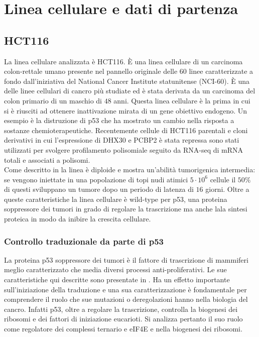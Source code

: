 \chapter{Linea cellulare e dati di partenza}
\label{cha:cell_lines}

\section{HCT116}
\label{sec:hct116}
La linea cellulare analizzata \`e HCT116.
\`E una linea cellulare di un carcinoma colon-rettale umano presente nel pannello originale delle $60$ linee caratterizzate a fondo dall'iniziativa del National Cancer Institute statunitense (NCI-$60$).
\`E una delle linee cellulari di cancro pi\`u studiate ed \`e stata derivata da un carcinoma del colon primario di un maschio di $48$ anni.
Questa linea cellulare \`e la prima in cui si \`e riusciti ad ottenere inattivazione mirata di un gene obiettivo endogeno.
Un esempio \`e la distruzione di p53 che ha mostrato un cambio nella risposta a sostanze chemioterapeutiche\cite{p53disruption}.
Recentemente cellule di HCT116 parentali e cloni derivativi in cui l'espressione di DHX30 e PCBP2 \`e stata repressa sono stati utilizzati per svolgere profilamento polisomiale seguito da RNA-seq di mRNA totali e associati a polisomi.\\
Come descritto in \cite{hct116} la linea \`e diploide e mostra un'abilit\`a tumorigenica intermedia: se vengono iniettate in una popolazione di topi nudi atimici $5\cdot 10^6$ cellule il $50\%$ di questi sviluppano un tumore dopo un periodo di latenza di $16$ giorni.
Oltre a queste caratteristiche la linea cellulare \`e wild-type per p53, una proteina soppressore dei tumori in grado di regolare la trascrizione ma anche lala  sintesi proteica in modo da inibire la crescita cellulare.

  \subsection{Controllo traduzionale da parte di p53}
  \label{subsec:p53}
  La proteina p53 soppressore dei tumori \`e il fattore di trascrizione di mammiferi meglio caratterizzato che media diversi processi anti-proliferativi.
  Le sue caratteristiche qui descritte sono presentate in \cite{transconp53}.
  Ha un effetto importante sull'iniziazione della traduzione e una sua caratterizzazione \`e fondamentale per comprendere il ruolo che sue mutazioni o deregolazioni hanno nella biologia del cancro.
  Infatti p53, oltre a regolare la trascrizione, controlla la biogenesi dei ribosomi e dei fattori di iniziazione eucarioti.
  Si analizza pertanto il suo ruolo come regolatore dei complessi ternario e eIF4E e nella biogenesi dei ribosomi.

